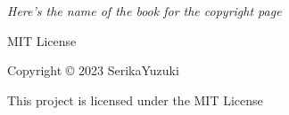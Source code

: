 \null\vfill
\begin{flushleft}
\thispagestyle{empty}
\textit{Here's the name of the book for the copyright page}

MIT License

Copyright © 2023 SerikaYuzuki

\noindent This project is licensed under the MIT License
\end{flushleft}
